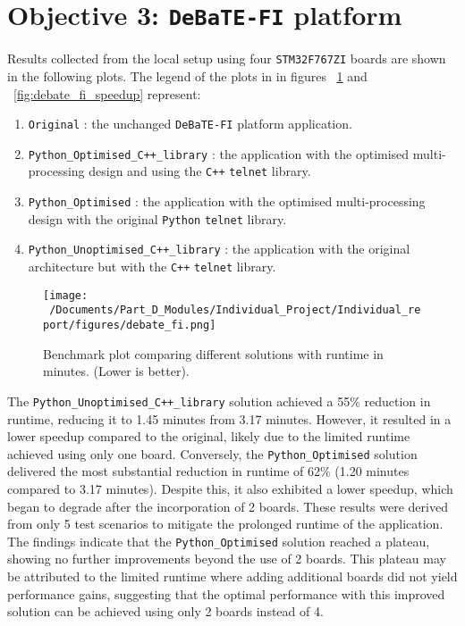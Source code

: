 \section{Objective 3: \texttt{DeBaTE-FI} platform}

Results collected from the local setup using four \texttt{STM32F767ZI} boards are shown in the following plots. The legend of the plots in in figures ~\ref{fig:debate_fi_plot} and ~\ref{fig:debate_fi_speedup} represent:

\begin{enumerate}
	\item \texttt{Original} : the unchanged \texttt{DeBaTE-FI} platform application. 
	\item \texttt{Python\_Optimised\_C++\_library} : the application with the optimised multi-processing design and using the \texttt{C++} \texttt{telnet} library.
	\item \texttt{Python\_Optimised} : the application with the optimised multi-processing design with the original \texttt{Python} \texttt{telnet} library.
	\item \texttt{Python\_Unoptimised\_C++\_library} : the application with the original architecture but with the \texttt{C++} \texttt{telnet} library.
\end{enumerate}

\begin{figure}[htbp] %
	\centering
	\texttt{[image: ~/Documents/Part\_D\_Modules/Individual\_Project/Individual\_report/figures/debate\_fi.png]} %
	\caption{Benchmark plot comparing different solutions with runtime in minutes. (Lower is better).}
	\label{fig:debate_fi_plot} %
\end{figure}

The \texttt{Python\_Unoptimised\_C++\_library} solution achieved a 55\% reduction in runtime, reducing it to 1.45 minutes from 3.17 minutes. However, it resulted in a lower speedup compared to the original, likely due to the limited runtime achieved using only one board. Conversely, the \texttt{Python\_Optimised} solution delivered the most substantial reduction in runtime of 62\% (1.20 minutes compared to 3.17 minutes). Despite this, it also exhibited a lower speedup, which began to degrade after the incorporation of 2 boards. These results were derived from only 5 test scenarios to mitigate the prolonged runtime of the application. The findings indicate that the \texttt{Python\_Optimised} solution reached a plateau, showing no further improvements beyond the use of 2 boards. This plateau may be attributed to the limited runtime where adding additional boards did not yield performance gains, suggesting that the optimal performance with this improved solution can be achieved using only 2 boards instead of 4.

